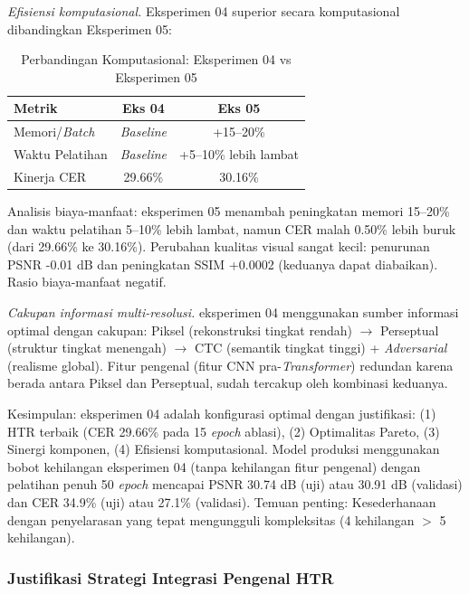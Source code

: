 \documentclass[journal]{IEEEtran}
\begin{document}
\textit{Efisiensi komputasional.} Eksperimen 04 superior secara komputasional dibandingkan Eksperimen 05:

\begin{table}[!t]
\centering
\footnotesize
\caption{Perbandingan Komputasional: Eksperimen 04 vs Eksperimen 05}
\label{table_exp04_computational}
\begin{tabular}{lcc}
\hline
\textbf{Metrik} & \textbf{Eks 04} & \textbf{Eks 05} \\
\hline
Memori/\textit{Batch} & \textit{Baseline} & +15--20\% \\
Waktu Pelatihan & \textit{Baseline} & +5--10\% lebih lambat \\
Kinerja CER & 29.66\% & 30.16\% \\
\hline
\end{tabular}
\end{table}

Analisis biaya-manfaat: eksperimen 05 menambah peningkatan memori 15--20\% dan waktu pelatihan 5--10\% lebih lambat, namun CER malah 0.50\% lebih buruk (dari 29.66\% ke 30.16\%). Perubahan kualitas visual sangat kecil: penurunan PSNR -0.01 dB dan peningkatan SSIM +0.0002 (keduanya dapat diabaikan). Rasio biaya-manfaat negatif.

\textit{Cakupan informasi multi-resolusi.} eksperimen 04 menggunakan sumber informasi optimal dengan cakupan: Piksel (rekonstruksi tingkat rendah) $\rightarrow$ Perseptual (struktur tingkat menengah) $\rightarrow$ CTC (semantik tingkat tinggi) + \textit{Adversarial} (realisme global). Fitur pengenal (fitur CNN pra-\textit{Transformer}) redundan karena berada antara Piksel dan Perseptual, sudah tercakup oleh kombinasi keduanya.

Kesimpulan: eksperimen 04 adalah konfigurasi optimal dengan justifikasi: (1) HTR terbaik (CER 29.66\% pada 15 \textit{epoch} ablasi), (2) Optimalitas Pareto, (3) Sinergi komponen, (4) Efisiensi komputasional. Model produksi menggunakan bobot kehilangan eksperimen 04 (tanpa kehilangan fitur pengenal) dengan pelatihan penuh 50 \textit{epoch} mencapai PSNR 30.74 dB (uji) atau 30.91 dB (validasi) dan CER 34.9\% (uji) atau 27.1\% (validasi). Temuan penting: Kesederhanaan dengan penyelarasan yang tepat mengungguli kompleksitas (4 kehilangan $>$ 5 kehilangan).

\subsubsection{Justifikasi Strategi Integrasi Pengenal HTR}
\label{sec:ablation}
\end{document}
